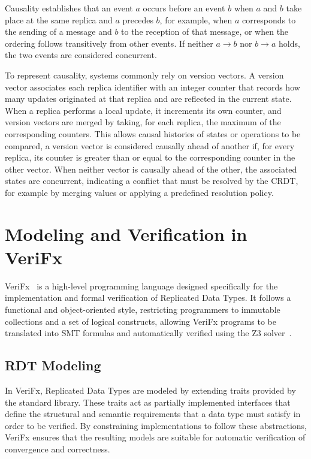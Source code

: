 Causality establishes that an event $a$ occurs before an event $b$ when $a$ and $b$ take place at the same replica and $a$ precedes $b$, for example, when $a$ corresponds to the sending of a message and $b$ to the reception of that message, or when the ordering follows transitively from other events. If neither $a \rightarrow b$ nor $b \rightarrow a$ holds, the two events are considered concurrent.

To represent causality, systems commonly rely on version vectors. A version vector associates each replica identifier with an integer counter that records how many updates originated at that replica and are reflected in the current state. When a replica performs a local update, it increments its own counter, and version vectors are merged by taking, for each replica, the maximum of the corresponding counters. This allows causal histories of states or operations to be compared, a version vector is considered causally ahead of another if, for every replica, its counter is greater than or equal to the corresponding counter in the other vector. When neither vector is causally ahead of the other, the associated states are concurrent, indicating a conflict that must be resolved by the CRDT, for example by merging values or applying a predefined resolution policy.

\section{Modeling and Verification in VeriFx}
\label{sec:verifx}

VeriFx~\cite{porre2023masses} is a high-level programming language designed specifically for the implementation and formal verification of Replicated Data Types. It follows a functional and object-oriented style, restricting programmers to immutable collections and a set of logical constructs, allowing VeriFx programs to be translated into SMT formulas and automatically verified using the Z3 solver~\cite{z3}.

\subsection{RDT Modeling}
\label{sub:modeling}

In VeriFx, Replicated Data Types are modeled by extending traits provided by the standard library. These traits act as partially implemented interfaces that define the structural and semantic requirements that a data type must satisfy in order to be verified. By constraining implementations to follow these abstractions, VeriFx ensures that the resulting models are suitable for automatic verification of convergence and correctness.

